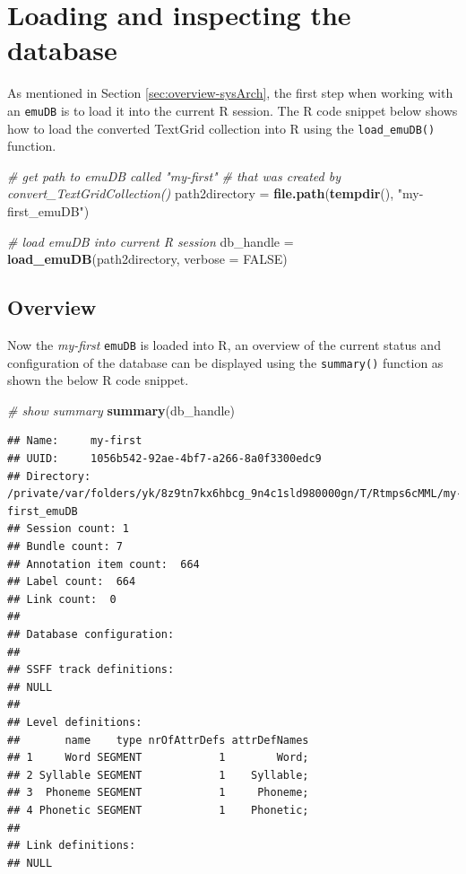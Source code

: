 \documentclass[]{book}
\newenvironment{Shaded}{\begin{snugshade}}{\end{snugshade}}
\newcommand{\CommentTok}[1]{\textcolor[rgb]{0.56,0.35,0.01}{\textit{#1}}}
\newcommand{\DataTypeTok}[1]{\textcolor[rgb]{0.13,0.29,0.53}{#1}}
\newcommand{\KeywordTok}[1]{\textcolor[rgb]{0.13,0.29,0.53}{\textbf{#1}}}
\newcommand{\NormalTok}[1]{#1}
\newcommand{\OtherTok}[1]{\textcolor[rgb]{0.56,0.35,0.01}{#1}}
\newcommand{\StringTok}[1]{\textcolor[rgb]{0.31,0.60,0.02}{#1}}
\begin{document}
\hypertarget{loading-and-inspecting-the-database}{%
\section{Loading and inspecting the database}\label{loading-and-inspecting-the-database}}

As mentioned in Section \ref{sec:overview-sysArch}, the first step when working with an \texttt{emuDB} is to load it into the current R session. The R code snippet below shows how to load the converted TextGrid collection into R using the \texttt{load\_emuDB()} function.

\begin{Shaded}
\begin{Highlighting}[]
\CommentTok{# get path to emuDB called "my-first"}
\CommentTok{# that was created by convert_TextGridCollection()}
\NormalTok{path2directory =}\StringTok{ }\KeywordTok{file.path}\NormalTok{(}\KeywordTok{tempdir}\NormalTok{(), }\StringTok{"my-first_emuDB"}\NormalTok{)}

\CommentTok{# load emuDB into current R session}
\NormalTok{db_handle =}\StringTok{ }\KeywordTok{load_emuDB}\NormalTok{(path2directory, }\DataTypeTok{verbose =} \OtherTok{FALSE}\NormalTok{)}
\end{Highlighting}
\end{Shaded}

\hypertarget{overview}{%
\subsection{Overview}\label{overview}}

Now the \emph{my-first} \texttt{emuDB} is loaded into R, an overview of the current status and configuration of the database can be displayed using the \texttt{summary()} function as shown the below R code snippet.

\begin{Shaded}
\begin{Highlighting}[]
\CommentTok{# show summary}
\KeywordTok{summary}\NormalTok{(db_handle)}
\end{Highlighting}
\end{Shaded}

\begin{verbatim}
## Name:     my-first 
## UUID:     1056b542-92ae-4bf7-a266-8a0f3300edc9 
## Directory:    /private/var/folders/yk/8z9tn7kx6hbcg_9n4c1sld980000gn/T/Rtmps6cMML/my-first_emuDB 
## Session count: 1 
## Bundle count: 7 
## Annotation item count:  664 
## Label count:  664 
## Link count:  0 
## 
## Database configuration:
## 
## SSFF track definitions:
## NULL
## 
## Level definitions:
##       name    type nrOfAttrDefs attrDefNames
## 1     Word SEGMENT            1        Word;
## 2 Syllable SEGMENT            1    Syllable;
## 3  Phoneme SEGMENT            1     Phoneme;
## 4 Phonetic SEGMENT            1    Phonetic;
## 
## Link definitions:
## NULL
\end{verbatim}
\end{document}
